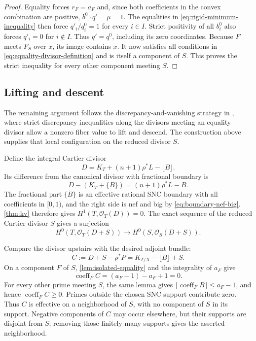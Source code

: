\begin{proof}
Equality forces $r_F=a_F$ and, since both coefficients in the convex combination are positive, $b^0\cdot q'=\mu=1$. The equalities in \eqref{eq:rigid-minimum-inequality} then force $q'_i/q_i^0=1$ for every $i\in I$.  Strict positivity of all $b_i^0$ also forces $q'_i=0$ for $i\notin I$.  Thus $q'=q^0$, including its zero coordinates.  Because $F$ meets $F_S$ over $x$, its image contains $x$.  It now satisfies all conditions in \eqref{eq:equality-divisor-definition} and is itself a component of $S$.  This proves the strict inequality for every other component meeting $S$.
\end{proof}

\subsection{Lifting and descent}\label{subsec:sec-final-lift}

The remaining argument follows the discrepancy-and-vanishing strategy in \cite[\S1(1.6)]{fujita1993}, where strict discrepancy inequalities along the divisors meeting an equality divisor allow a nonzero fiber value to lift and descend. The construction above supplies that local configuration on the reduced divisor $S$.

Define the integral Cartier divisor
\begin{equation}
 D=K_T+(n+1)\rho^*L-\lfloor B\rfloor.
 \label{eq:final-lifting-divisor}
\end{equation}
Its difference from the canonical divisor with fractional boundary is
\[
 D-(K_T+\{B\})=(n+1)\rho^*L-B.
\]
The fractional part $\{B\}$ is an effective rational SNC boundary with all coefficients in $[0,1)$, and the right side is nef and big by \eqref{eq:boundary-nef-big}.  \cref{thm:kv} therefore gives $H^1(T,\mathcal{O}_T(D))=0$.  The exact sequence of the reduced Cartier divisor $S$ gives a surjection
\begin{equation}
 H^0(T,\mathcal{O}_T(D+S))
       \longrightarrow H^0(S,\mathcal{O}_S(D+S)).
 \label{eq:final-restriction-surjection}
\end{equation}

Compare the divisor upstairs with the desired adjoint bundle:
\begin{equation}
 C:=D+S-\rho^*P=K_{T/X}-\lfloor B\rfloor+S.
 \label{eq:final-correction}
\end{equation}
On a component $F$ of $S$, \cref{lem:isolated-equality} and the integrality of $a_F$ give
\[
 \operatorname{coeff}_F C=(a_F-1)-a_F+1=0.
\]
For every other prime meeting $S$, the same lemma gives $\lfloor\operatorname{coeff}_F B\rfloor\leq a_F-1$, and hence $\operatorname{coeff}_F C\geq0$.  Primes outside the chosen SNC support contribute zero.  Thus $C$ is effective on a neighborhood of $S$, with no component of $S$ in its support.  Negative components of $C$ may occur elsewhere, but their supports are disjoint from $S$; removing those finitely many supports gives the asserted neighborhood.

